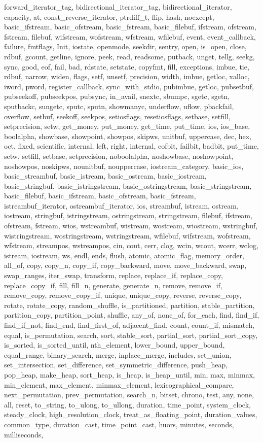 {forward_iterator_tag, bidirectional_iterator_tag, bidirectional_iterator, capacity, at, const_reverse_iterator, ptrdiff_t, flip, hash, noexcept, basic_ifstream, basic_ofstream, basic_fstream, basic_filebuf, ifstream, ofstream, fstream, filebuf, wifstream, wofstream, wfstream, wfilebuf, event, event_callback, failure, fmtflags, Init, iostate, openmode, seekdir, sentry, open, is_open, close, rdbuf, gcount, getline, ignore, peek, read, readsome, putback, unget, tellg, seekg, sync, good, eof, fail, bad, rdstate, setstate, copyfmt, fill, exceptions, imbue, tie, rdbuf, narrow, widen, flags, setf, unsetf, precision, width, imbue, getloc, xalloc, iword, pword, register_callback, sync_with_stdio, pubimbue, getloc, pubsetbuf, pubseekoff, pubseekpos, pubsync, in_avail, snextc, sbumpc, sgetc, sgetn, sputbackc, sungetc, sputc, sputn, showmanyc, underflow, uflow, pbackfail, overflow, setbuf, seekoff, seekpos, setiosflags, resetiosflags, setbase, setfill, setprecision, setw, get_money, put_money, get_time, put_time, ios, ios_base, boolalpha, showbase, showpoint, showpos, skipws, unitbuf, uppercase, dec, hex, oct, fixed, scientific, internal, left, right, internal, eofbit, failbit, badbit, put_time, setw, setfill, setbase, setprecision, noboolalpha, noshowbase, noshowpoint, noshowpos, noskipws, nounitbuf, nouppercase, iostream_category, basic_ios, basic_streambuf, basic_istream, basic_ostream, basic_iostream, basic_stringbuf, basic_istringstream, basic_ostringstream, basic_stringstream, basic_filebuf, basic_ifstream, basic_ofstream, basic_fstream, istreambuf_iterator, ostreambuf_iterator, ios, streambuf, istream, ostream, iostream, stringbuf, istringstream, ostringstream, stringstream, filebuf, ifstream, ofstream, fstream, wios, wstreambuf, wistream, wostream, wiostream, wstringbuf, wistringstream, wostringstream, wstringstream, wfilebuf, wifstream, wofstream, wfstream, streampos, wstreampos, cin, cout, cerr, clog, wcin, wcout, wcerr, wclog, istream, iostream, ws, endl, ends, flush, atomic, atomic_flag, memory_order, all_of, copy, copy_n, copy_if, copy_backward, move, move_backward, swap, swap_ranges, iter_swap, transform, replace, replace_if, replace_copy, replace_copy_if, fill, fill_n, generate, generate_n, remove, remove_if, remove_copy, remove_copy_if, unique, unique_copy, reverse, reverse_copy, rotate, rotate_copy, random_shuffle, is_partitioned, partition, stable_partition, partition_copy, partition_point, shuffle, any_of, none_of, for_each, find, find_if, find_if_not, find_end, find_first_of, adjacent_find, count, count_if, mismatch, equal, is_permutation, search, sort, stable_sort, partial_sort, partial_sort_copy, is_sorted, is_sorted_until, nth_element, lower_bound, upper_bound, equal_range, binary_search, merge, inplace_merge, includes, set_union, set_intersection, set_difference, set_symmetric_difference, push_heap, pop_heap, make_heap, sort_heap, is_heap, is_heap_until, min, max, minmax, min_element, max_element, minmax_element, lexicographical_compare, next_permutation, prev_permutation, search_n, bitset, chrono, test, any, none, all, reset, to_string, to_ulong, to_ullong, duration, time_point, system_clock, steady_clock, high_resolution_clock, treat_as_floating_point, duration_values, common_type, duration_cast, time_point_cast, huors, minutes, seconds, milliseconds, }

